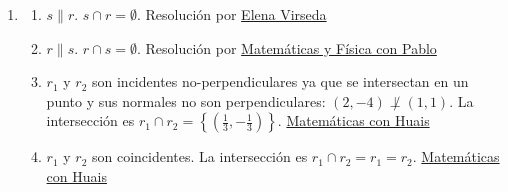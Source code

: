 \documentclass[a4paper]{article}
\newcommand{\exercise}{\item}
\newcommand{\SEL}[1]{\left\{\begin{matrix} #1 \end{matrix}\right.}
\begin{document}
\begin{enumerate}
\begin{enumerate} [label=(\alph*)]
		\item La recta es única. De los puntos $A(-4,0)$ y $B(0,3)$ se obtiene el vector director $\overrightarrow{AB}=(4,3)$. \\ $(x,y)=(0,3)+k(4,3)$. \\ $\SEL{ x=4k \hfill \\ y=3+3k }$ \\ $\displaystyle{\frac{x}{4}=\frac{y-3}{3}}$.
		\item No existe una recta que cumpla con las condiciones ya que los puntos no están alineados. Se puede ver porque $\overrightarrow{PQ} \nparallel\overrightarrow{QR}$
		\item La recta NO es única, la misma responde a la ecuación $y=mx+2$ o $(x,y)=(0,2)+k(a,b)$. Por ejemplo, se elije $m=1$ y se obtiene la recta $y=x+2$.
		\item La recta NO es única. Se obtiene el vector unitario $\hat{d}=(\cos 30^{\circ}, \sin 30^{\circ})=\left(\frac{\sqrt{3}}{2},\frac{1}{2}\right)$ como director. Se puede elegir cualquier punto para definir la recta. Por ejemplo, con $P(1,3)$ y se obtiene la recta $(x,y)=(1,3)+k\left(\frac{\sqrt{3}}{2},\frac{1}{2}\right)$.
		\item $\vec{n}$ puede ser $\overrightarrow{n_1}=(\cos 45^{\circ}, \sin 45^{\circ})=\left(\frac{\sqrt{2}}{2},\frac{\sqrt{2}}{2}\right)$ o $\overrightarrow{n_2}=(\cos 135^{\circ}, \sin 135^{\circ})=\left(-\frac{\sqrt{2}}{2},\frac{\sqrt{2}}{2}\right)$. Por lo que la recta no es única. Las opciones son: $(x,y)=(3,-2)+k\left(\frac{\sqrt{2}}{2},\frac{\sqrt{2}}{2}\right)$ o $(x,y)=(3,-2)+t\left(-\frac{\sqrt{2}}{2},\frac{\sqrt{2}}{2}\right)$.
\end{enumerate}\exercise\begin{enumerate} [label=(\alph*)]		\item $s \parallel r$. $s \cap r=\emptyset$.  Resolución por \href{https://youtu.be/cHsXMw3V4mQ}{Elena Virseda}
		\item $r \parallel s$. $r \cap s=\emptyset$. Resolución por \href{https://youtu.be/MPUh70MKVUY}{Matemáticas y Física con Pablo}
		\item $r_1$ y $r_2$ son incidentes no-perpendiculares ya que se intersectan en un punto y sus normales no son perpendiculares: $(2,-4) \not\perp (1,1)$. La intersección es $r_1 \cap r_2=\left\{ \left(\frac{1}{3},-\frac{1}{3}\right)\right\}$. \href{https://youtu.be/LgIU8pd8DeM?t=97}{Matemáticas con Huais}
		\item $r_1$ y $r_2$ son coincidentes. La intersección es $r_1 \cap r_2=r_1=r_2$. \href{https://youtu.be/LgIU8pd8DeM?t=884}{Matemáticas con Huais}

\end{enumerate}
\end{enumerate}
\end{document}
